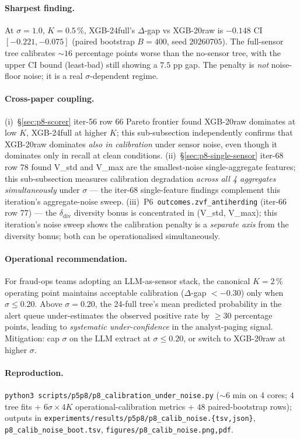 \documentclass{article}
\begin{document}
\paragraph{Sharpest finding.}
At $\sigma{=}1.0$, $K{=}0.5\,\%$, XGB-24full's $\Delta$-gap vs
XGB-20raw is $\mathbf{-0.148}$ CI $[-0.221, -0.075]$ (paired
bootstrap $B{=}400$, seed $20260705$). The full-sensor tree
calibrates $\sim 16$ percentage points worse than the no-sensor tree,
with the upper CI bound (least-bad) still showing a $7.5$ pp gap.
The penalty is \emph{not} noise-floor noise; it is a real
$\sigma$-dependent regime.

\paragraph{Cross-paper coupling.}
(i)~\S\ref{sec:p8-scorer} iter-56 row 66 Pareto frontier found
XGB-20raw dominates at low $K$, XGB-24full at higher $K$; this
sub-subsection independently confirms that XGB-20raw dominates
\emph{also in calibration} under sensor noise, even though it
dominates only in recall at clean conditions. (ii)~\S\ref{sec:p8-single-sensor}
iter-68 row 78 found V\_std and V\_max are the smallest-noise
single-aggregate features; this sub-subsection measures
calibration degradation \emph{across all 4 aggregates simultaneously}
under $\sigma$ — the iter-68 single-feature findings complement
this iteration's aggregate-noise sweep. (iii)~P6~\texttt{outcomes.zvf\_antiherding}
(iter-66 row 77) — the $\delta_{\mathrm{div}}$ diversity bonus is
concentrated in (V\_std, V\_max); this iteration's noise sweep shows
the calibration penalty is a \emph{separate axis} from the diversity
bonus; both can be operationalised simultaneously.

\paragraph{Operational recommendation.}
For fraud-ops teams adopting an LLM-as-sensor stack, the canonical
$K{=}2\,\%$ operating point maintains acceptable calibration
($\Delta$-gap $< -0.30$) only when $\sigma \leq 0.20$. Above
$\sigma{=}0.20$, the 24-full tree's mean predicted probability in the
alert queue under-estimates the observed positive rate by
$\geq 30$ percentage points, leading to \emph{systematic
under-confidence} in the analyst-paging signal. Mitigation: cap
$\sigma$ on the LLM extract at $\sigma \leq 0.20$, or switch to
XGB-20raw at higher $\sigma$.

\paragraph{Reproduction.}
\texttt{python3 scripts/p5p8/p8\_calibration\_under\_noise.py}
($\sim 6$ min on 4 cores; $4$ tree fits + $6 \sigma \times 4 K$
operational-calibration metrics + $48$ paired-bootstrap rows);
outputs in
\texttt{experiments/results/p5p8/p8\_calib\_noise.\{tsv,json\}},
\texttt{p8\_calib\_noise\_boot.tsv},
\texttt{figures/p8\_calib\_noise.{png,pdf}}.
\end{document}
